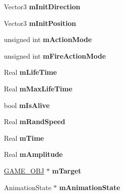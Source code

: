 \begin{DoxyCompactItemize}
\item 
\hypertarget{class_g_a_m_e___o_b_j_a7604343f0f80c8028ada3f21007e77f0}{Vector3 {\bfseries m\-Init\-Direction}}\label{class_g_a_m_e___o_b_j_a7604343f0f80c8028ada3f21007e77f0}

\item 
\hypertarget{class_g_a_m_e___o_b_j_a7a965e4b5f428fbf79544c72f1dafed7}{Vector3 {\bfseries m\-Init\-Position}}\label{class_g_a_m_e___o_b_j_a7a965e4b5f428fbf79544c72f1dafed7}

\item 
\hypertarget{class_g_a_m_e___o_b_j_a81573c1b47da8b13f5cb3f019996133a}{unsigned int {\bfseries m\-Action\-Mode}}\label{class_g_a_m_e___o_b_j_a81573c1b47da8b13f5cb3f019996133a}

\item 
\hypertarget{class_g_a_m_e___o_b_j_a9e7399dfeebe550871fc8aa9ff08d15b}{unsigned int {\bfseries m\-Fire\-Action\-Mode}}\label{class_g_a_m_e___o_b_j_a9e7399dfeebe550871fc8aa9ff08d15b}

\item 
\hypertarget{class_g_a_m_e___o_b_j_a06cd2ee5af1a884e096be40ca5e77e41}{Real {\bfseries m\-Life\-Time}}\label{class_g_a_m_e___o_b_j_a06cd2ee5af1a884e096be40ca5e77e41}

\item 
\hypertarget{class_g_a_m_e___o_b_j_a7e0a593d6273fdf6bb50b83e81ca5208}{Real {\bfseries m\-Max\-Life\-Time}}\label{class_g_a_m_e___o_b_j_a7e0a593d6273fdf6bb50b83e81ca5208}

\item 
\hypertarget{class_g_a_m_e___o_b_j_a42022f7440233c4f697e476e5fdce744}{bool {\bfseries m\-Is\-Alive}}\label{class_g_a_m_e___o_b_j_a42022f7440233c4f697e476e5fdce744}

\item 
\hypertarget{class_g_a_m_e___o_b_j_a70f8e8f74573160abc8ffd6373d2e193}{Real {\bfseries m\-Rand\-Speed}}\label{class_g_a_m_e___o_b_j_a70f8e8f74573160abc8ffd6373d2e193}

\item 
\hypertarget{class_g_a_m_e___o_b_j_ab798cf1f5d4c2411163facccb57b33e6}{Real {\bfseries m\-Time}}\label{class_g_a_m_e___o_b_j_ab798cf1f5d4c2411163facccb57b33e6}

\item 
\hypertarget{class_g_a_m_e___o_b_j_afe5eb59c2eb8bda9d96fe79f3eb7893c}{Real {\bfseries m\-Amplitude}}\label{class_g_a_m_e___o_b_j_afe5eb59c2eb8bda9d96fe79f3eb7893c}

\item 
\hypertarget{class_g_a_m_e___o_b_j_a5a0e21e5c5f78788a31506cf7ff813a3}{\hyperlink{class_g_a_m_e___o_b_j}{G\-A\-M\-E\-\_\-\-O\-B\-J} $\ast$ {\bfseries m\-Target}}\label{class_g_a_m_e___o_b_j_a5a0e21e5c5f78788a31506cf7ff813a3}

\item 
\hypertarget{class_g_a_m_e___o_b_j_afb32c5a54e7c1c481b9cbbd2c0c3f2ad}{Animation\-State $\ast$ {\bfseries m\-Animation\-State}}\label{class_g_a_m_e___o_b_j_afb32c5a54e7c1c481b9cbbd2c0c3f2ad}

\end{DoxyCompactItemize}


